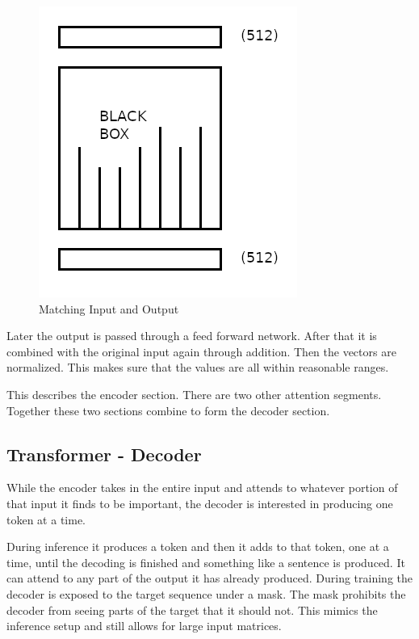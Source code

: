 \begin{figure}[H]
	\begin{center}
		
	
	\includegraphics[scale=0.5]{diagram-mat02}
\end{center}
	\caption[Matching Input and Output]{Matching Input and Output}
	
\end{figure}


Later the output is passed through a feed forward network. After that it is combined with the original input again through addition. Then the vectors are normalized. This makes sure that the values are all within reasonable ranges.

This describes the encoder section. There are two other attention segments. Together these two sections combine to form the decoder section.

\subsection*{Transformer - Decoder}
While the encoder takes in the entire input and attends to whatever portion of that input it finds to be important, the decoder is interested in producing one token at a time. 

During inference it produces a token and then it adds to that token, one at a time, until the decoding is finished and something like a sentence is produced. It can attend to any part of the output it has already produced. During training the decoder is exposed to the target sequence under a mask. The mask prohibits the decoder from seeing parts of the target that it should not. This mimics the inference setup and still allows for large input matrices.

